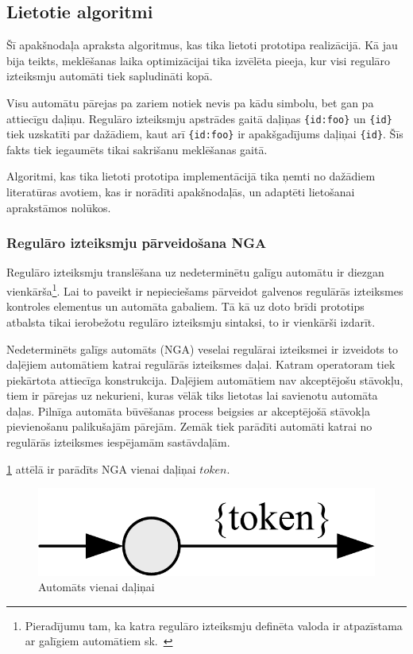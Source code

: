 \subsection{\label{sbs:prot_algorithms}Lietotie algoritmi}

Šī apakšnodaļa apraksta algoritmus, kas tika lietoti prototipa realizācijā. Kā jau bija teikts, meklēšanas laika optimizācijai tika izvēlēta pieeja, kur visi regulāro izteiksmju automāti tiek sapludināti kopā.

Visu automātu pārejas pa zariem notiek nevis pa kādu simbolu, bet gan pa attiecīgu daļiņu. Regulāro izteiksmju apstrādes gaitā daļiņas \verb|{id:foo}| un \verb|{id}| tiek uzskatīti par dažādiem, kaut arī \verb|{id:foo}| ir apakšgadījums daļiņai \verb|{id}|. Šīs fakts tiek iegaumēts tikai sakrišanu meklēšanas gaitā.

Algoritmi, kas tika lietoti prototipa implementācijā tika ņemti no dažādiem literatūras avotiem, kas ir norādīti apakšnodaļās, un adaptēti lietošanai aprakstāmos nolūkos.

\subsubsection{Regulāro izteiksmju pārveidošana NGA}

Regulāro izteiksmju translēšana uz nedeterminētu galīgu automātu ir diezgan vienkārša\footnote{Pieradījumu tam, ka katra regulāro izteiksmju definēta valoda ir atpazīstama ar galīgiem automātiem sk.~\cite{RegularExpressionsNFA}}. Lai to paveikt ir nepieciešams  pārveidot galvenos regulārās izteiksmes kontroles elementus un automāta gabaliem. Tā kā uz doto brīdi prototips atbalsta tikai ierobežotu regulāro izteiksmju sintaksi, to ir vienkārši izdarīt.

Nedeterminēts galīgs automāts (NGA) veselai regulārai izteiksmei ir izveidots to daļējiem automātiem katrai regulārās izteiksmes daļai. Katram operatoram tiek piekārtota attiecīga konstrukcija. Daļējiem automātiem nav akceptējošu stāvokļu, tiem ir pārejas uz nekurieni, kuras vēlāk tiks lietotas lai savienotu automāta daļas. Pilnīga automāta būvēšanas process beigsies ar akceptējošā stāvokļa pievienošanu palikušajām pārejām. Zemāk tiek parādīti automāti katrai no regulārās izteiksmes iespējamām sastāvdaļām.

\ref{fig:auto_token} attēlā ir parādīts NGA vienai daļiņai ${token}$.
\begin{figure}[H]
  \centering
    \includegraphics[scale=1.5]{pictures/auto_token}
  \caption{\label{fig:auto_token}Automāts vienai daļiņai}
\end{figure}

